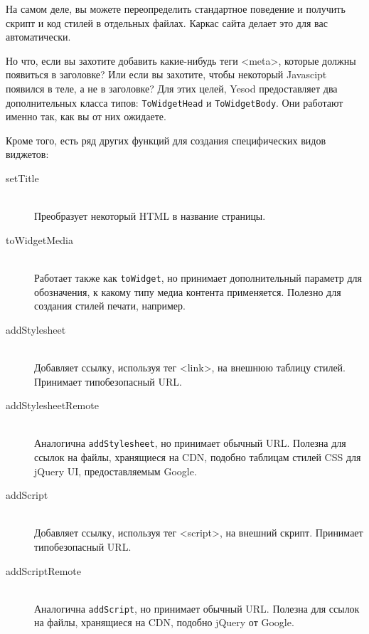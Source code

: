 \begin{remark}
    На самом деле, вы можете переопределить стандартное поведение и получить
    скрипт и код стилей в отдельных файлах. Каркас сайта делает это для вас
    автоматически.
\end{remark}

Но что, если вы захотите добавить какие-нибудь теги <meta>, которые должны
появиться в заголовке? Или если вы захотите, чтобы некоторый Javascipt появился
в теле, а не в заголовке? Для этих целей, Yesod предоставляет два
дополнительных класса типов: \lstinline'ToWidgetHead' и
\lstinline'ToWidgetBody'. Они работают именно так, как вы от них ожидаете.

Кроме того, есть ряд других функций для создания специфических видов виджетов:
\begin{description}
    \item[setTitle] \hfill \\
        Преобразует некоторый HTML в название страницы.

    \item[toWidgetMedia] \hfill \\
        Работает также как \lstinline'toWidget', но принимает дополнительный
        параметр для обозначения, к какому типу медиа контента применяется.
        Полезно для создания стилей печати, например.

    \item[addStylesheet] \hfill \\
        Добавляет ссылку, используя тег <link>, на внешнюю таблицу стилей.
        Принимает типобезопасный URL.

    \item[addStylesheetRemote] \hfill \\
        Аналогична \lstinline'addStylesheet', но принимает обычный URL. Полезна
        для ссылок на файлы, хранящиеся на CDN, подобно таблицам стилей CSS для
        jQuery UI, предоставляемым Google.

    \item[addScript] \hfill \\
        Добавляет ссылку, используя тег <script>, на внешний скрипт. Принимает
        типобезопасный URL.

    \item[addScriptRemote] \hfill \\
        Аналогична \lstinline'addScript', но принимает обычный URL. Полезна для
        ссылок на файлы, хранящиеся на CDN, подобно jQuery от Google.
\end{description}

